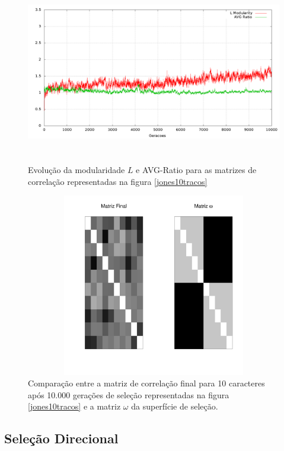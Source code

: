\begin{figure}[htbp]
  \centering
  \includegraphics[width=150mm, height=80mm]{figuras/jones10tracosStats.png}
  \caption{Evolução da modularidade $L$ e AVG-Ratio para as matrizes de
  correlação representadas na figura \ref{jones10tracos}}
  \label{jones10tracosStats}
\end{figure}



\begin{figure}[htbp]
  \centering
  \includegraphics[width=150mm, height=80mm]{figuras/Mat10tracos}
  \caption{Comparação entre a matriz de correlação final para 10
  caracteres após 10.000 gerações de seleção representadas na figura
  \ref{jones10tracos} e a matriz $\omega$ da superfície de seleção.}
  \label{MatJones10tracos}
\end{figure}



\subsection{Seleção Direcional}

